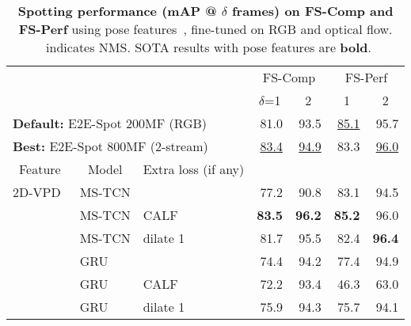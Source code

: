 \documentclass[runningheads]{llncs}
\newcommand{\OURMETHOD}{{E2E-Spot}\xspace}
\newcommand{\fscomp}{{FS-Comp}\xspace}
\newcommand{\fsperf}{{FS-Perf}\xspace}
\newcommand{\best}[1]{\underline{#1}}
\newcommand{\sota}[1]{\textbf{#1}}
\newcommand{\nms}{\textsuperscript{\textdagger}}
\begin{document}
\renewcommand{\tabcolsep}{0.2cm}
\begin{table}[tp]
    \centering
    \caption{{\bf Spotting performance (mAP @ $\delta$ frames) on \fscomp and \fsperf} using pose features~\cite{vpd}, fine-tuned on RGB and optical flow.
    \textdagger~indicates NMS.
    SOTA results with pose features are \sota{bold}.}
    \label{tab:supp_full_result_pose}
    \vspace{0.5em}
    {
    \scriptsize
    \begin{tabularx}{0.87\textwidth}{lll
        rr
        rr
    }
        \toprule
        &&
            & \multicolumn{2}{c}{\fscomp}
            & \multicolumn{2}{c}{\fsperf}
            \\
        &&
            & \multicolumn{1}{c}{$\delta$=1}
            & \multicolumn{1}{c}{2}
            & \multicolumn{1}{c}{1}
            & \multicolumn{1}{c}{2}
            \\
        \midrule

        \multicolumn{3}{l}{{\bf Default:} \OURMETHOD 200MF (RGB)}
            & \nms 81.0 & \nms 93.5 & \nms \best{85.1} & \nms 95.7 \\
        \multicolumn{3}{l}{{\bf Best:} \OURMETHOD 800MF (2-stream)}
            & \nms \best{83.4} & \nms \best{94.9} & \nms 83.3 & \nms \best{96.0} \\

        \midrule
        \multicolumn{1}{c}{Feature}
            & \multicolumn{1}{c}{Model}
            & \multicolumn{1}{c}{Extra loss (if any)}
            \\

        \midrule
        2D-VPD~\cite{vpd}
        & MS-TCN &
            & 77.2 & \nms 90.8 & 83.1 & \nms 94.5 \\

        & MS-TCN & CALF
            & \sota{83.5} & \nms \sota{96.2} & \sota{85.2} & \nms 96.0 \\

        & MS-TCN & dilate 1
            & 81.7 & \nms 95.5 & 82.4 & \nms \sota{96.4} \\

        \cmidrule{2-7}
        & GRU &
            & \nms 74.4 & \nms 94.2 & \nms 77.4 & \nms 94.9 \\

        & GRU & CALF
            & \nms 72.2 & \nms 93.4 & \nms 46.3 & \nms 63.0 \\

        & GRU & dilate 1
            & \nms 75.9 & \nms 94.3 & \nms 75.7 & \nms 94.1 \\


\end{tabularx}}
\end{table}
\end{document}
